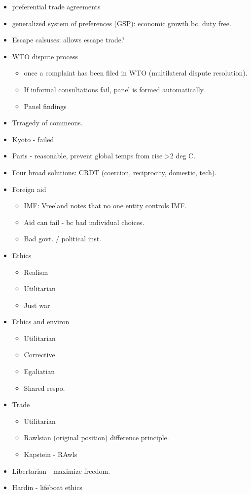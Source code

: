 \documentclass{article}
\begin{document}
\begin{itemize}
  \item preferential trade agreements
  \item generalized system of preferences (GSP): economic growth bc. duty free.
  \item Escape calsuses: allows escape trade?
  \item WTO dispute process
    \begin{itemize}
      \item once a complaint has been filed in WTO (multilateral dispute resolution).
      \item If informal consultations fail, panel is formed automatically.
      \item Panel findings
    \end{itemize}
  \item Trragedy of commeons.
  \item Kyoto - failed
  \item Paris - reasonable, prevent global temps from rise >2 deg C.
  \item Four broad solutions: CRDT (coercion, reciprocity, domestic, tech).
  \item Foreign aid
    \begin{itemize}
      \item IMF: Vreeland notes that no one entity controls IMF.
      \item Aid can fail - bc bad individual choices.
      \item Bad govt. / political inst.
    \end{itemize}
  \item Ethics
    \begin{itemize}
      \item Realism
      \item Utilitarian
      \item Just war
    \end{itemize}
  \item Ethics and environ
    \begin{itemize}
      \item Utilitarian
      \item Corrective
      \item Egaliatian
      \item Shared respo.
    \end{itemize}
  \item Trade
    \begin{itemize}
      \item Utilitarian
      \item Rawlsian (original position) difference principle.
      \item Kapstein - RAwls
    \end{itemize}
  \item Libertarian - maximize freedom.
  \item Hardin - lifeboat ethics
\end{itemize}
\end{document}
